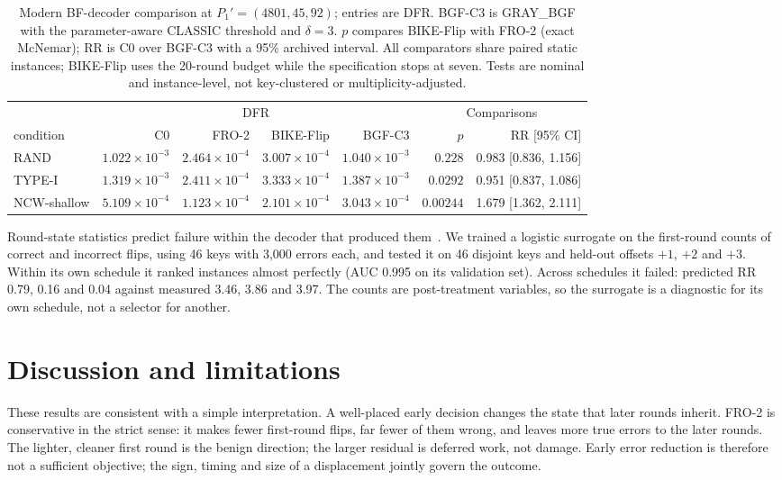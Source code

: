 \documentclass[letterpaper,journal]{IEEEtran}
\begin{document}
\begin{table}[!t]
\centering
\small
\caption{Modern BF-decoder comparison at $P_1'=(4801,45,92)$; entries are DFR. BGF-C3 is GRAY\_BGF with the parameter-aware CLASSIC threshold and $\delta=3$. $p$ compares BIKE-Flip with FRO-2 (exact McNemar); RR is C0 over BGF-C3 with a 95\% archived interval. All comparators share paired static instances; BIKE-Flip uses the 20-round budget while the specification stops at seven. Tests are nominal and instance-level, not key-clustered or multiplicity-adjusted.}
\label{tab:modern}
\begin{tabular}{lrrrrrr}
\toprule
 & \multicolumn{4}{c}{DFR} & \multicolumn{2}{c}{Comparisons} \\
\cmidrule(lr){2-5} \cmidrule(lr){6-7}
condition & C0 & FRO-2 & BIKE-Flip & BGF-C3 & $p$ & RR [95\% CI] \\
\midrule
RAND & $1.022\times10^{-3}$ & $2.464\times10^{-4}$ & $3.007\times10^{-4}$ & $1.040\times10^{-3}$ & $0.228$ & 0.983 [0.836, 1.156] \\
TYPE-I & $1.319\times10^{-3}$ & $2.411\times10^{-4}$ & $3.333\times10^{-4}$ & $1.387\times10^{-3}$ & $0.0292$ & 0.951 [0.837, 1.086] \\
NCW-shallow & $5.109\times10^{-4}$ & $1.123\times10^{-4}$ & $2.101\times10^{-4}$ & $3.043\times10^{-4}$ & $0.00244$ & 1.679 [1.362, 2.111] \\
\bottomrule
\end{tabular}
\end{table}
\label{sec:counterfactual}
Round-state statistics predict failure within the decoder that produced them~\cite{kim2021logistic,paiva2022pickyfix}. We trained a logistic surrogate on the first-round counts of correct and incorrect flips, using 46 keys with 3,000 errors each, and tested it on 46 disjoint keys and held-out offsets $+1$, $+2$ and $+3$. Within its own schedule it ranked instances almost perfectly (AUC 0.995 on its validation set). Across schedules it failed: predicted RR 0.79, 0.16 and 0.04 against measured 3.46, 3.86 and 3.97. The counts are post-treatment variables, so the surrogate is a diagnostic for its own schedule, not a selector for another.
\section{Discussion and limitations}\label{sec:discussion}

These results are consistent with a simple interpretation. A well-placed early decision changes the state that later rounds inherit. FRO-2 is conservative in the strict sense: it makes fewer first-round flips, far fewer of them wrong, and leaves more true errors to the later rounds. The lighter, cleaner first round is the benign direction; the larger residual is deferred work, not damage. Early error reduction is therefore not a sufficient objective; the sign, timing and size of a displacement jointly govern the outcome.
\end{document}
